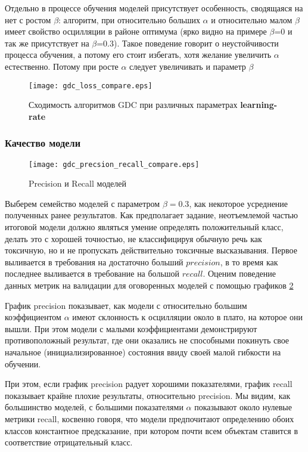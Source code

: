 \documentclass{article}
\begin{document}
        Отдельно в процессе обучения моделей присутствует особенность, сводящаяся на нет с ростом $\beta$: алгоритм, при относительно больших $\alpha$ и относительно малом $\beta$ имеет свойство осцилляции в районе оптимума (ярко видно на примере $\beta$=0 и так же присутствует на $\beta$=0.3). Такое поведение говорит о неустойчивости процесса обучения, а потому его стоит избегать, хотя желание увеличить $\alpha$ естественно. Потому при росте $\alpha$ следует увеличивать и параметр $\beta$
        
    \begin{figure}[t]
        \centerline{\texttt{[image: gdc\_loss\_compare.eps]}}
        \caption{Сходимость алгоритмов GDC при различных параметрах \textbf{learning-rate}}
        \label{fig:loss_gdc_compare}
    \end{figure}

        
    \subsubsection{Качество модели}

    \begin{figure}[t]
        \centering
        \texttt{[image: gdc\_precsion\_recall\_compare.eps]}
        \caption{Precision и Recall моделей}
        \label{fig:precsision_recall_gdc}
    \end{figure}

        Выберем семейство моделей с параметром $\beta=0.3$, как некоторое усреднение полученных ранее результатов. Как предполагает задание, неотъемлемой частью итоговой модели должно являться умение определять положительный класс, делать это с хорошей точностью, не классифицируя обычную речь как токсичную, но и не пропускать действительно токсичные высказывания. Первое выливается в требования на достаточно больший $precision$, в то время как последнее выливается в требование на большой $recall$. Оценим поведение данных метрик на валидации для оговоренных моделей с помощью графиков \ref{fig:precsision_recall_gdc}

        График precision показывает, как модели с относительно большим коэффициентом $\alpha$ имеют склонность к осцилляции около в плато, на которое они вышли. При этом модели с малыми коэффициентами демонстрируют противоположный результат, где они оказались не способными покинуть свое начальное (инициализированное) состояния ввиду своей малой гибкости на обучении. 

        При этом, если график precision радует хорошими показателями, график recall показывает крайне плохие результаты, относительно precision. Мы видим, как большинство моделей, с большими показателями $\alpha$ показывают около нулевые метрики recall, косвенно говоря, что модели предпочитают определению обоих классов константное предсказание, при котором почти всем объектам ставится в соответствие отрицательный класс.
\end{document}

